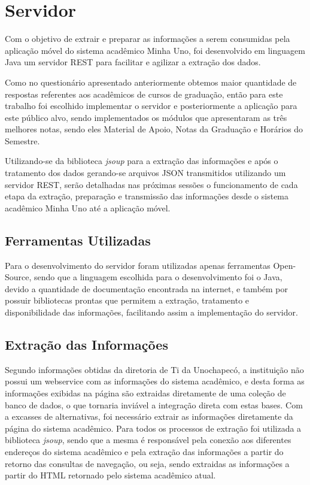 \chapter{Servidor}
Com o objetivo de extrair e preparar as informações a serem consumidas pela aplicação móvel do sistema acadêmico Minha Uno, foi desenvolvido em linguagem Java um servidor REST para facilitar e agilizar a extração dos dados. 

Como no questionário apresentado anteriormente obtemos maior quantidade de respostas referentes aos acadêmicos de cursos de graduação, então para este trabalho foi escolhido implementar o servidor e posteriormente a aplicação para este público alvo, sendo implementados os módulos que apresentaram as três melhores notas, sendo eles Material de Apoio, Notas da Graduação e Horários do Semestre.

Utilizando-se da biblioteca \emph{jsoup} para a extração das informações e após o tratamento dos dados gerando-se arquivos JSON transmitidos utilizando um servidor REST, serão detalhadas nas próximas sessões o funcionamento de cada etapa da extração, preparação e transmissão das informações desde o sistema acadêmico Minha Uno até a aplicação móvel.

\section{Ferramentas Utilizadas}
Para o desenvolvimento do servidor foram utilizadas apenas ferramentas Open-Source, sendo que a linguagem escolhida para o desenvolvimento foi o Java, devido a quantidade de documentação encontrada na internet, e também por possuir bibliotecas prontas que permitem a extração, tratamento e disponibilidade das informações, facilitando assim a implementação do servidor.

\section{Extração das Informações}

Segundo informações obtidas da diretoria de Ti da Unochapecó, a instituição não possui um webservice com as informações do sistema acadêmico, e desta forma as informações exibidas na página são extraidas diretamente de uma coleção de banco de dados, o que tornaria inviável a integração direta com estas bases. Com a excasses de alternativas, foi necessário extrair as informações diretamente da página do sistema acadêmico. Para todos os processos de extração foi utilizada a biblioteca \emph{jsoup}, sendo que a mesma é responsável pela conexão aos diferentes endereços do sistema acadêmico e pela extração das informações a partir do retorno das consultas de navegação, ou seja, sendo extraidas as informações a partir do HTML retornado pelo sistema acadêmico atual.

